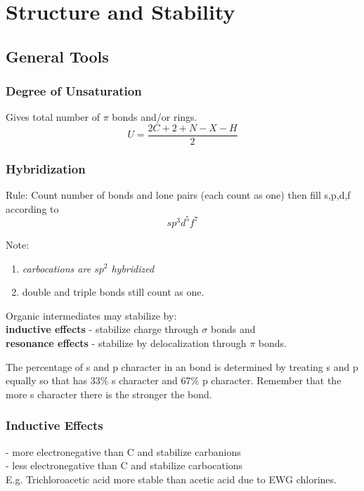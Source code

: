 \documentclass[../OChemReview.tex]{subfiles}
\begin{document}
\chapter{Structure and Stability}
\section{General Tools}
\subsection{Degree of Unsaturation}
Gives total number of $ \pi $ bonds and/or rings.  \[ U = \dfrac{2C + 2 + N - X
- H}{2} \]

\subsection{Hybridization\supddag}

Rule: Count number of bonds and lone pairs (each count as one) then fill s,p,d,f
according to
\[ sp^{3}d^{5}f^{7} \]

Note:
\begin{enumerate}
  \item \emph{carbocations are $ sp^{2} $ hybridized}
  \item double and triple bonds still count as one.
\end{enumerate}

Organic intermediates may stabilize by:\\ \textbf{inductive effects} - stabilize
charge through $ \sigma $ bonds and \\
\textbf{resonance effects} - stabilize by delocalization through $ \pi $ bonds.

The percentage of s and p character in an  bond is determined by
treating s and p equally so that  has 33\% s character and 67\%
p character. Remember that the more s character there is the stronger the bond.

\subsection{Inductive Effects}

 - more electronegative than C and stabilize
carbanions\\
 - less electronegative than C and stabilize
carbocations\\
E.g. Trichloroacetic acid more stable than acetic acid due to EWG chlorines.
\end{document}
